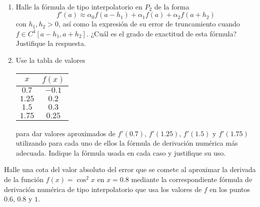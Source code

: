 \begin{ejercicio}\label{ej:2.1.7}~
    \begin{enumerate}
        \item Halle la fórmula de tipo interpolatorio en $P_2$ de la forma
        \[
        f'(a) \approx \alpha_0 f(a - h_1) + \alpha_1 f(a) + \alpha_2 f(a + h_2)
        \]
        con $h_1, h_2 > 0$, así como la expresión de su error de truncamiento cuando $f \in C^4[a - h_1, a + h_2]$. ¿Cuál es el grado de exactitud de esta fórmula? Justifique la respuesta.
        
        \item Use la tabla de valores
        \begin{center}
            \begin{tabular}{c|c}
                $x$ & $f(x)$ \\
                \hline
                $0.7$ & $-0.1$ \\
                $1.25$ & $0.2$ \\
                $1.5$ & $0.3$ \\
                $1.75$ & $0.25$
            \end{tabular}
        \end{center}
        para dar valores aproximados de $f'(0.7)$, $f'(1.25)$, $f'(1.5)$ y $f'(1.75)$ utilizando para cada uno de ellos la fórmula de derivación numérica más adecuada. Indique la fórmula usada en cada caso y justifique su uso.
    \end{enumerate}
\end{ejercicio}

\begin{ejercicio}\label{ej:2.1.8}
    Halle una cota del valor absoluto del error que se comete al aproximar la derivada de la función $f(x) = \cos^2 x$ en $x = 0.8$ mediante la correspondiente fórmula de derivación numérica de tipo interpolatorio que usa los valores de $f$ en los puntos $0.6$, $0.8$ y $1$.
\end{ejercicio}
